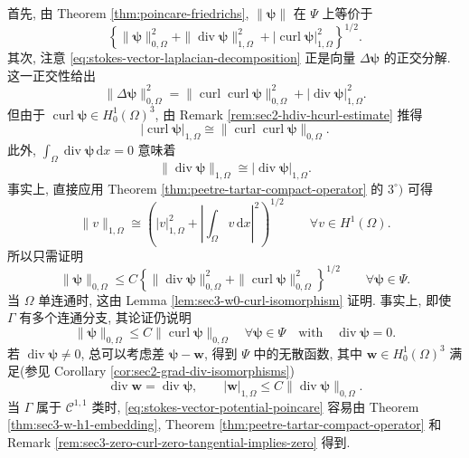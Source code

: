 \begin{Proof}
首先, 由 Theorem \ref{thm:poincare-friedrichs},
$\|\boldsymbol{\psi}\|$ 在 $\Psi$ 上等价于
\[
\left\{
\|\boldsymbol{\psi}\|_{0,\Omega}^2
+\|\operatorname{div}\boldsymbol{\psi}\|_{1,\Omega}^2
+|\operatorname{curl}\boldsymbol{\psi}|_{1,\Omega}^2
\right\}^{1/2}.
\]
其次, 注意
\eqref{eq:stokes-vector-laplacian-decomposition}
正是向量 $\Delta\boldsymbol{\psi}$ 的正交分解. 这一正交性给出
\[
\|\Delta\boldsymbol{\psi}\|_{0,\Omega}^2
=
\|\operatorname{curl}\operatorname{curl}
\boldsymbol{\psi}\|_{0,\Omega}^2
+|\operatorname{div}\boldsymbol{\psi}|_{1,\Omega}^2.
\]
但由于
$\operatorname{curl}\boldsymbol{\psi}\in H_0^1(\Omega)^3$,
由 Remark \ref{rem:sec2-hdiv-hcurl-estimate} 推得
\[
|\operatorname{curl}\boldsymbol{\psi}|_{1,\Omega}
\cong
\|\operatorname{curl}\operatorname{curl}
\boldsymbol{\psi}\|_{0,\Omega}.
\]
此外,
$\int_\Omega\operatorname{div}\boldsymbol{\psi}\,\mathrm{d}x=0$
意味着
\[
\|\operatorname{div}\boldsymbol{\psi}\|_{1,\Omega}
\cong
|\operatorname{div}\boldsymbol{\psi}|_{1,\Omega}.
\]
事实上, 直接应用 Theorem
\ref{thm:peetre-tartar-compact-operator} 的 $3^\circ)$ 可得
\[
\|v\|_{1,\Omega}
\cong
\left(
|v|_{1,\Omega}^2
+\left|\int_\Omega v\,\mathrm{d}x\right|^2
\right)^{1/2}
\qquad
\forall v\in H^1(\Omega).
\]
所以只需证明
\begin{equation}\label{eq:stokes-vector-potential-poincare}
\|\boldsymbol{\psi}\|_{0,\Omega}
\le
C\left\{
\|\operatorname{div}\boldsymbol{\psi}\|_{0,\Omega}^2
+\|\operatorname{curl}\boldsymbol{\psi}\|_{0,\Omega}^2
\right\}^{1/2}
\qquad
\forall\boldsymbol{\psi}\in\Psi.
\end{equation}
当 $\Omega$ 单连通时, 这由 Lemma
\ref{lem:sec3-w0-curl-isomorphism} 证明.
事实上, 即使 $\Gamma$ 有多个连通分支, 其论证仍说明
\[
\|\boldsymbol{\psi}\|_{0,\Omega}
\le
C\|\operatorname{curl}\boldsymbol{\psi}\|_{0,\Omega}
\quad
\forall\boldsymbol{\psi}\in\Psi
\quad\text{with}\quad
\operatorname{div}\boldsymbol{\psi}=0.
\]
若 $\operatorname{div}\boldsymbol{\psi}\ne0$, 总可以考虑差
$\boldsymbol{\psi}-\mathbf{w}$, 得到 $\Psi$ 中的无散函数,
其中 $\mathbf{w}\in H_0^1(\Omega)^3$ 满足(参见 Corollary
\ref{cor:sec2-grad-div-isomorphisms})
\[
\operatorname{div}\mathbf{w}
=\operatorname{div}\boldsymbol{\psi},
\qquad
|\mathbf{w}|_{1,\Omega}
\le
C\|\operatorname{div}\boldsymbol{\psi}\|_{0,\Omega}.
\]
当 $\Gamma$ 属于 $\mathcal{C}^{1,1}$ 类时,
\eqref{eq:stokes-vector-potential-poincare} 容易由 Theorem
\ref{thm:sec3-w-h1-embedding}, Theorem
\ref{thm:peetre-tartar-compact-operator} 和 Remark
\ref{rem:sec3-zero-curl-zero-tangential-implies-zero} 得到.
\end{Proof}

